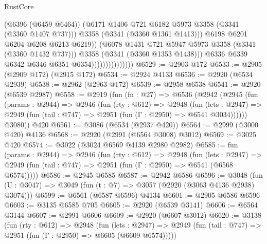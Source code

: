 \begin{lexlean}{RustCore}
\begin{coremodule}
                                          (@6396 (@6459 @6464))
                                          (@6171
                                            @1406
                                            @721
                                            @6182
                                            @5973
                                            @3358
                                            (@3341 (@3360 @1407 @737)))
                                          @3358
                                          (@3341 (@3360 @1361 @1413)))
                                        @6198
                                        @6201
                                        @6204
                                        @6208
                                        @6213
                                        @6219))
                                    (@6078 @1431 @721 @5947 @5973 @3358 (@3341 (@3360 @1432 @737)))
                                    @3358
                                    (@3341 (@3360 @1353 @1438)))
                                  @6336
                                  @6339
                                  @6342
                                  @6346
                                  @6351
                                  @6354)))))))))))))))
@6529 := @2903 @172
@6533 := @2905 (@2909 @172) (@2915 @172)
@6534 := @2924 @4133
@6536 := @2920 (@6534 @2939)
@6538 := @2962 (@2963 @172)
@6539 := @2958 @6538
@6541 := @2920 (@6539 @2987)
@6558 := @2919
    (fun (fn : @27) =>
    @6536
      (@2942
        (@2945
          (fun (params : @2944) =>
          @2946
            (fun (rty : @612) =>
            @2948
              (fun (lets : @2947) =>
              @2949 (fun (tail : @747) => @2951 (fun (Γ : @2950) => @6541 @3034))))))
        @3080))
    @420
@6561 := @3086 (@6534 (@2937 @420))
@6564 := @2999 (@3000 @420) @4136
@6568 := @2920 (@2991 (@6564 @3008) @3012)
@6569 := @3025 @420
@6574 := @3022 (@3024 @6569 @4139 @2980 @2982)
@6585 := fun (params : @2944) =>
  @2946
    (fun (rty : @612) =>
    @2948
      (fun (lets : @2947) =>
      @2949 (fun (tail : @747) => @2951 (fun (Γ : @2950) => @6541 (@6568 @6574)))))
@6586 := @2945 @6585
@6587 := @2942 @6586
@6596 := @3048 (fun (U : @3047) => @3049 (fun (t : @7) => @3057 (@2920 (@3063 @4136 @2938) @3074)))
@6599 := @6561 (@6587 @6596) @4134
@6601 := @2905 @6586 @6596
@6603 := @3135 @6585 @705
@6605 := @2920 (@6539 @3141)
@6606 := @6564 @3144
@6607 := @2991 @6606
@6609 := @2920 (@6607 @3012)
@6620 := @3138
    (fun (rty : @612) =>
    @2948
      (fun (lets : @2947) =>
      @2949 (fun (tail : @747) => @2951 (fun (Γ : @2950) => @6605 (@6609 @6574)))))

\end{coremodule}
\end{lexlean}
